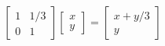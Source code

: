 \documentclass{article}
\begin{document}
\thispagestyle{empty}

$$
\begin{bmatrix}1&1/3\\0&1\end{bmatrix}
\begin{bmatrix}x\\y\end{bmatrix} = \begin{bmatrix}x+y/3\\y\end{bmatrix}
$$
\end{document}
